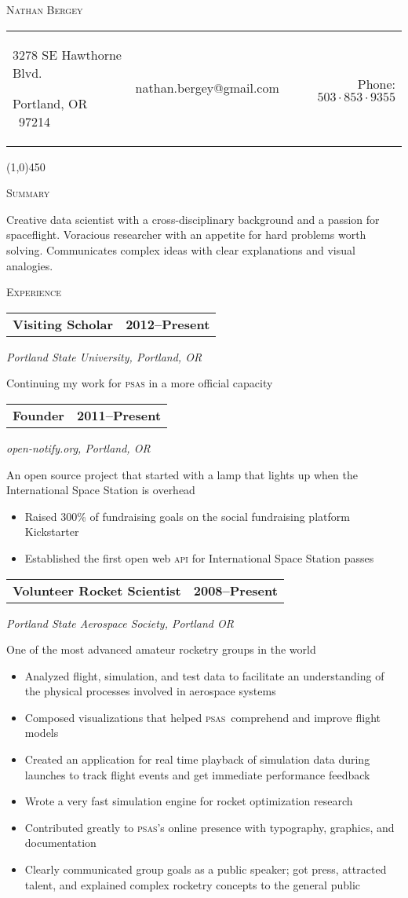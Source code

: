 \documentclass[letterpaper,10pt]{article}
\makeatletter
\newcommand{\me}      {Nathan Bergey}
\newcommand{\email}   {nathan.bergey@gmail.com}
\newcommand{\address} {\begin{minipage}{2in}\raggedright3278 SE Hawthorne Blvd.\par Portland, OR \ 97214\end{minipage}}
\newcommand{\phone}   {$503\cdot853\cdot9355$}
\newcommand{\PSAS}{\textsc{psas}}
\newcommand{\resumepageheader}{
  \begin{center}
    {\LARGE{\textsc{\me}}}

    \vspace{0.2in}

    \begin{tabular*}{6.5in}{l c@{\extracolsep{\fill}} r}
      \address & \email & Phone: \phone \\
    \end{tabular*}
    
    \vspace{0.02in}

    \line(1,0){450}
  \end{center}
}
\newcommand{\resumestatement}[1]{
  \vspace{0.05in}
  \textsc{\Large Summary}
  \vspace{0.1in}
  \begin{center}
    \begin{minipage}{5.5in}
      \small
      #1
    \end{minipage}
  \end{center}
}
\newcommand{\resumeheader}[1]{
  \vspace{0.08in}
  \textsc{\Large #1}
  \vspace{0.10in}
}
\newcommand{\resumeitem}[4]{
  {\addtolength{\leftskip}{0.21in}
    \begin{tabular*}{6.25in}{l@{\extracolsep{\fill}} r}
      {\textbf{#1}} & {\textbf{#2}} \\
    \end{tabular*}
    
  }
  
  \vspace{0.01in}
  {\addtolength{\leftskip}{0.3in}
    \textit{#3}\par
  }
  
  \vspace{0.07in}
  {\addtolength{\leftskip}{0.3in}
    \small
    \begin{minipage}{5in}
      #4
    \end{minipage}
    
  }
  \vspace{0.15in}
}
\makeatother
\begin{document}
\resumepageheader

\resumestatement{
                  Creative data scientist with a cross-disciplinary background 
                  and a passion for spaceflight. Voracious researcher with an 
                  appetite for hard problems worth solving. Communicates complex 
                  ideas with clear explanations and visual analogies.
                }


\resumeheader{Experience} 

\resumeitem{Visiting Scholar}{2012--Present}%
           {Portland State University, Portland, OR}%
           {
              Continuing my work for \textsc{psas} in a more official capacity
           }

\resumeitem{Founder}{2011--Present}%
           {open-notify.org, Portland, OR}%
           {
              An open source project that started with a lamp that lights up 
              when the International Space Station is overhead
              \begin{itemize}[topsep=1pt, itemsep=0pt, parsep=0pt]
                \renewcommand{\labelitemi}{---}
                \item Raised 300\% of fundraising goals on the social fundraising platform Kickstarter
                \item Established the first open web \textsc{api} for International Space Station passes
              \end{itemize}
           }

\resumeitem{Volunteer Rocket Scientist}{2008--Present}%
           {Portland State Aerospace Society, Portland OR}%
           {
              One of the most advanced amateur rocketry groups in the world
              \begin{itemize}[topsep=1pt, itemsep=0pt, parsep=0pt]
                \renewcommand{\labelitemi}{---}
                \item Analyzed flight, simulation, and test data to facilitate an understanding of the physical processes involved in aerospace systems
                \item Composed visualizations that helped \PSAS\ comprehend and improve flight models
                \item Created an application for real time playback of simulation data during launches to track flight events and get immediate performance feedback
                \item Wrote a very fast simulation engine for rocket optimization research
                \item Contributed greatly to \PSAS's online presence with typography, graphics, and documentation
                \item Clearly communicated group goals as a public speaker; got press, attracted talent, and explained complex rocketry concepts to the general public
              \end{itemize}
           }
           
\end{document}
